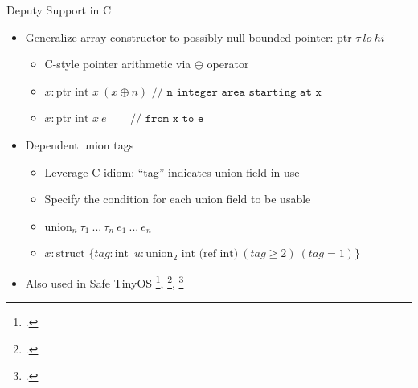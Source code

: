 \documentclass[aspectratio=169]{beamer}
\begin{document}
\begin{frame}{Deputy}
Support in C
    \begin{itemize}
        \item Generalize array constructor to possibly-null bounded pointer: \emph{$\text{ptr }\tau \ lo\ hi$}
            \begin{itemize}
                \item C-style pointer arithmetic via $\oplus$ operator %
                \item $x:\text{ptr int } x\ (x \oplus n)$ $\texttt{// n integer area starting at x}$
                \item $x:\text{ptr int } x\ e\ \ \ \ \ \ \ \ $ $\texttt{// from x to e}$
            \end{itemize}
        \item Dependent union tags
            \begin{itemize}
                \item Leverage C idiom: ``tag'' indicates union field in use
                \item Specify the condition for each union field to be usable
                \item \emph{$\text{union}_n\ \tau_1\ ...\ \tau_n\ e_1\ ...\ e_n$}
                \item $x:\text{struct }\{ tag:\text{int}\;\ u: \text{union}_2 \text{ int (ref int)} \ (\textit{tag} \geq 2)\ (\textit{tag} = 1) \}$
            \end{itemize}
        \item Also used in Safe TinyOS \footcite{hill_system_2000}, \footcite{gay_nesc_2003}, \footcite{cooprider_efficient_2007}
    \end{itemize}
    \vspace{0.2in}
\end{frame}
\end{document}
